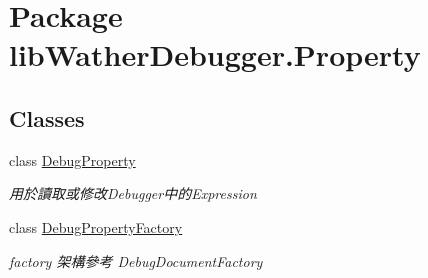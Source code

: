 \hypertarget{namespacelib_wather_debugger_1_1_property}{\section{Package lib\+Wather\+Debugger.\+Property}
\label{namespacelib_wather_debugger_1_1_property}
}
\subsection*{Classes}
\begin{DoxyCompactItemize}
\item 
class \hyperlink{classlib_wather_debugger_1_1_property_1_1_debug_property}{Debug\+Property}
\begin{DoxyCompactList}\small\item\em 用於讀取或修改\+Debugger中的\+Expression \end{DoxyCompactList}\item 
class \hyperlink{classlib_wather_debugger_1_1_property_1_1_debug_property_factory}{Debug\+Property\+Factory}
\begin{DoxyCompactList}\small\item\em factory 架構參考 Debug\+Document\+Factory \end{DoxyCompactList}\end{DoxyCompactItemize}
